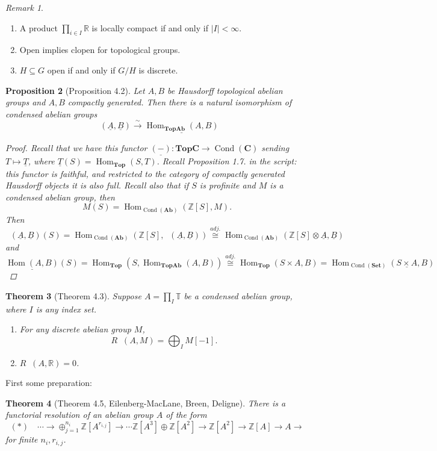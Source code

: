 \documentclass[12pt]{article}
\theoremstyle{darkgreentheorem}
\newtheorem{thm}{Theorem}[section]
\newtheorem{prop}[thm]{Proposition}
\theoremstyle{darkbluedefinition}
\theoremstyle{darkredexample}
\theoremstyle{remark}
\newtheorem{rem}[thm]{Remark}
\newcommand{\Z}{\mathbb{Z}}
\newcommand{\R}{\mathbb{R}}
\newcommand{\1}{\mathbbm{1}}
\newcommand{\bbT}{\mathbb{T}}
\newcommand{\bfC}{\mathbf{C}}
\newcommand{\Top}{\mathbf{Top}}
\newcommand{\Ab}{\mathbf{Ab}}
\newcommand{\Set}{\mathbf{Set}}
\DeclareMathOperator{\Hom}{Hom}
\DeclareMathOperator{\Cond}{Cond}
\DeclareMathOperator{\ihom}{\underline{Hom}}
\renewcommand{\u}[1]{\underline{#1}}
\newcommand{\ot}{\otimes}
\newcommand{\op}{\oplus}
\newcommand{\tms}{\times}
\newcommand{\sub}{\subseteq}
\begin{document}
\begin{rem}
    \begin{enumerate}[label=\roman*)]
	\item A product $\prod_{i\in I}\R$ is locally compact if and only if $|I|<\infty$.
	\item Open implies clopen for topological groups.
	\item $H\sub G$ open if and only if $G/H$ is discrete.
    \end{enumerate}
\end{rem}

\begin{prop}[Proposition 4.2]
    Let $A,B$ be Hausdorff topological abelian groups and $A,B$ compactly generated.
    Then there is a natural isomorphism of condensed abelian groups
    \[ \ihom(\u{A},\u{B})\xrightarrow{\sim} \u{\Hom_{\Top\Ab}(A,B)} \]
    \begin{proof}
	Recall that we have this functor $\u{(-)}\colon \Top\bfC\to \Cond(\bfC)$ sending $T\mapsto \u{T}$, where $\u{T}(S)=\Hom_{\Top}(S,T)$.
	Recall Proposition 1.7. in the script: this functor is faithful, and restricted to the category of compactly generated Hausdorff objects it is also full.
	Recall also that if $S$ is profinite and $M$ is a condensed abelian group, then
	\[ M(S)=\Hom_{\Cond(\Ab)}(\Z[S],M). \]
	Then
	\[ \ihom(\u{A},\u{B})(S)=\Hom_{\Cond(\Ab)}(\Z[S],\ihom(\u{A},\u{B}))\overset{adj.}{\cong} \Hom_{\Cond(\Ab)}(\Z[S]\ot \u{A}, \u{B}) \]
	and
	\[ \u{\Hom(A,B)}(S)=\Hom_{\Top}(S,\Hom_{\Top\Ab}(A,B))\overset{adj.}{\cong} \Hom_{\Top}(S\tms A,B)=\Hom_{\Cond(\Set)}(\u{S\tms A},B) \]
    \end{proof}
\end{prop}

\begin{thm}[Theorem 4.3]
    Suppose $A=\prod_{I}\bbT$ be a condensed abelian group, where $I$ is any index set.
    \begin{enumerate}[label=\roman*)]
	\item For any discrete abelian group $M$,
	    \[ R\ihom(A,M)=\bigoplus_{I}M[-1]. \]
	\item $R\ihom(A,\R)=0$.
    \end{enumerate}
\end{thm}

First some preparation:

\begin{thm}[Theorem 4.5, Eilenberg-MacLane, Breen, Deligne]
    There is a functorial resolution of an abelian group $A$ of the form
    \[ (*)\quad \cdots \to \op_{j=1}^{n_{i}}\Z[A^{r_{{i,j}}}]\to \cdots \Z[A^{3}]\op \Z[A^{2}]\to \Z[A^{2}]\to \Z[A]\to A\to \]
    for finite $n_{i},r_{i,j}$.
\end{thm}
\end{document}
